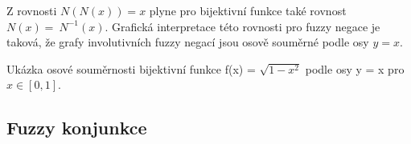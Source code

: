     \begin{remark}
        Z rovnosti $N(N(x))=x$ plyne pro bijektivn\'i funkce tak\'e rovnost $N(x)=~N^{-1}(x).$ 
         Grafick\'a interpretace  t\'eto rovnosti  pro fuzzy negace je taková, že grafy involutivních fuzzy negací jsou osově souměrné podle osy $y = x$.
        \begin{graph} Ukázka osové souměrnosti bijektivní funkce f(x) = $\sqrt{1-x^2}$ podle osy y = x pro $x \in [0,1]$.\\
            
        \end{graph}
    \end{remark}


    
\subsection{Fuzzy konjunkce}

